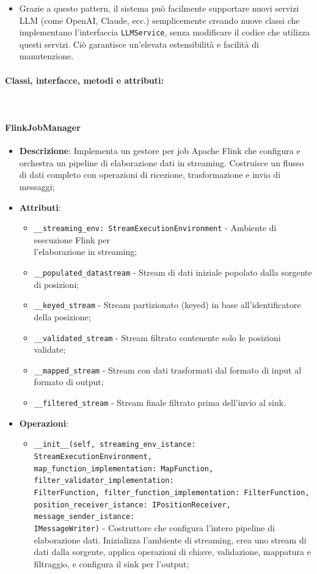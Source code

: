 \documentclass[10pt]{article}
\newcommand{\myparagraph}[1]{\paragraph{#1}\mbox{}\\}
\begin{document}
\begin{itemize}
\begin{itemize}
        \item Grazie a questo pattern, il sistema può facilmente supportare nuovi servizi LLM (come OpenAI, Claude, ecc.) semplicemente creando nuove classi che implementano l'interfaccia \texttt{LLMService}, senza modificare il codice che utilizza questi servizi. Ciò garantisce un'elevata estensibilità e facilità di manutenzione.
    \end{itemize}
    \end{itemize}


    \myparagraph{Classi, interfacce, metodi e attributi:}

    \paragraph{FlinkJobManager}
    \begin{itemize} 
    \item \textbf{Descrizione}: Implementa un gestore per job Apache Flink che configura e orchestra un pipeline di elaborazione dati in streaming. Costruisce un flusso di dati completo con operazioni di ricezione, trasformazione e invio di messaggi;
    \item \textbf{Attributi}:
    \begin{itemize}
        \item \texttt{\_\_streaming\_env: StreamExecutionEnvironment} - Ambiente di esecuzione Flink per\\ l'elaborazione in streaming;
        \item \texttt{\_\_populated\_datastream} - Stream di dati iniziale popolato dalla sorgente di posizioni;
        \item \texttt{\_\_keyed\_stream} - Stream partizionato (keyed) in base all'identificatore della posizione;
        \item \texttt{\_\_validated\_stream} - Stream filtrato contenente solo le posizioni validate;
        \item \texttt{\_\_mapped\_stream} - Stream con dati trasformati dal formato di input al formato di output;
        \item \texttt{\_\_filtered\_stream} - Stream finale filtrato prima dell'invio al sink.
    \end{itemize}
    
    \item \textbf{Operazioni}:
    \begin{itemize}
        \item \texttt{\_\_init\_\_(self, streaming\_env\_istance: StreamExecutionEnvironment,\\ map\_function\_implementation: MapFunction, filter\_validator\_implementation:\\ FilterFunction, filter\_function\_implementation: FilterFunction,\\ position\_receiver\_istance: IPositionReceiver, message\_sender\_istance:\\ IMessageWriter)} - Costruttore che configura l'intero pipeline di elaborazione dati. Inizializza l'ambiente di streaming, crea uno stream di dati dalla sorgente, applica operazioni di chiave, validazione, mappatura e filtraggio, e configura il sink per l'output;
        

\end{itemize}
\end{itemize}
\end{document}

